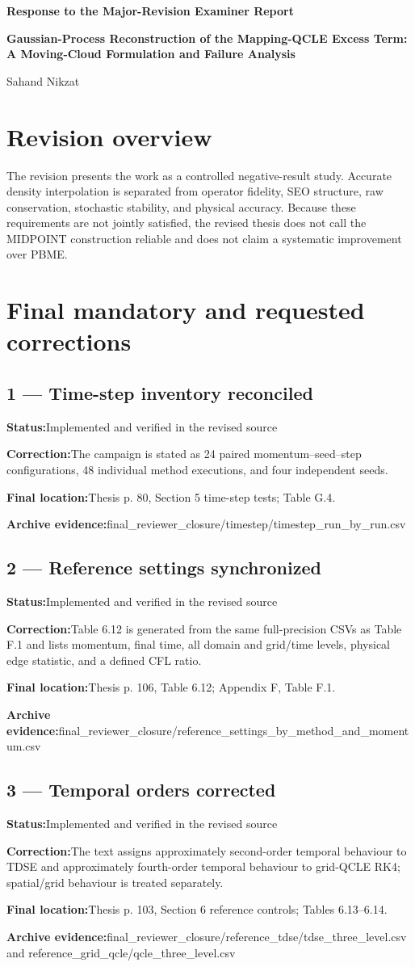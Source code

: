 \documentclass[11pt]{article}
\newcommand{\field}[2]{\textbf{#1}\quad #2\par}
\begin{document}
\raggedright
\begin{center}
{\Large\bfseries Response to the Major-Revision Examiner Report\par}
\vspace{6pt}
{\bfseries Gaussian-Process Reconstruction of the Mapping-QCLE Excess Term: A Moving-Cloud Formulation and Failure Analysis\par}
\vspace{4pt}Sahand Nikzat
\end{center}
\section*{Revision overview}
The revision presents the work as a controlled negative-result study. Accurate density interpolation is separated from operator fidelity, SEO structure, raw conservation, stochastic stability, and physical accuracy. Because these requirements are not jointly satisfied, the revised thesis does not call the MIDPOINT construction reliable and does not claim a systematic improvement over PBME.
\section*{Final mandatory and requested corrections}
\subsection*{1 --- Time-step inventory reconciled}
\field{Status:}{Implemented and verified in the revised source}
\field{Correction:}{The campaign is stated as 24 paired momentum--seed--step configurations, 48 individual method executions, and four independent seeds.}
\field{Final location:}{Thesis p. 80, Section 5 time-step tests; Table G.4.}
\field{Archive evidence:}{final\_reviewer\_closure/timestep/timestep\_run\_by\_run.csv}
\subsection*{2 --- Reference settings synchronized}
\field{Status:}{Implemented and verified in the revised source}
\field{Correction:}{Table 6.12 is generated from the same full-precision CSVs as Table F.1 and lists momentum, final time, all domain and grid/time levels, physical edge statistic, and a defined CFL ratio.}
\field{Final location:}{Thesis p. 106, Table 6.12; Appendix F, Table F.1.}
\field{Archive evidence:}{final\_reviewer\_closure/reference\_settings\_by\_method\_and\_momentum.csv}
\subsection*{3 --- Temporal orders corrected}
\field{Status:}{Implemented and verified in the revised source}
\field{Correction:}{The text assigns approximately second-order temporal behaviour to TDSE and approximately fourth-order temporal behaviour to grid-QCLE RK4; spatial/grid behaviour is treated separately.}
\field{Final location:}{Thesis p. 103, Section 6 reference controls; Tables 6.13--6.14.}
\field{Archive evidence:}{final\_reviewer\_closure/reference\_tdse/tdse\_three\_level.csv and reference\_grid\_qcle/qcle\_three\_level.csv}
\end{document}

